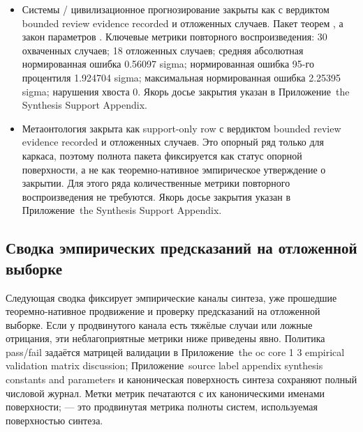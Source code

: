 \begin{itemize}[leftmargin=1.6em,nosep]
\item Системы / цивилизационное прогнозирование закрыты как  с вердиктом bounded review evidence recorded и  отложенных случаев. Пакет теорем , а закон параметров . Ключевые метрики повторного воспроизведения: 30 охваченных случаев; 18 отложенных случаев; средняя абсолютная нормированная ошибка 0.56097 sigma; нормированная ошибка 95-го процентиля 1.924704 sigma; максимальная нормированная ошибка 2.25395 sigma; нарушения хвоста 0. Якорь досье закрытия указан в Приложение~the Synthesis Support Appendix.
\item Метаонтология закрыта как support-only row с вердиктом bounded review evidence recorded и  отложенных случаев. Это опорный ряд только для каркаса, поэтому полнота пакета фиксируется как статус опорной поверхности, а не как теоремно-нативное эмпирическое утверждение о закрытии. Для этого ряда количественные метрики повторного воспроизведения не требуются. Якорь досье закрытия указан в Приложение~the Synthesis Support Appendix.
\end{itemize}

\subsection{Сводка эмпирических предсказаний на отложенной выборке}
Следующая сводка фиксирует эмпирические каналы синтеза, уже прошедшие теоремно-нативное продвижение и проверку предсказаний на отложенной выборке.
Если у продвинутого канала есть тяжёлые случаи или ложные отрицания, эти неблагоприятные метрики ниже приведены явно. Политика pass/fail задаётся матрицей валидации в Приложение~the oc core 1 3 empirical validation matrix discussion; Приложение~source label appendix synthesis constants and parameters и каноническая поверхность синтеза сохраняют полный числовой журнал.
Метки метрик печатаются с их каноническими именами поверхности;  — это продвинутая метрика полноты систем, используемая поверхностью синтеза.

